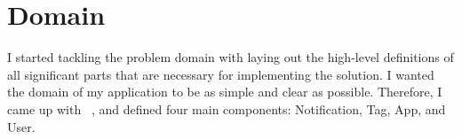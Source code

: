 \section{Domain}\label{sec:domain}

I started tackling the problem domain with laying out
the high-level definitions of all significant parts
that are necessary for implementing the solution.
I wanted the domain of my application
to be as simple and clear as possible.
Therefore,
I came up with
~\cite{evans_domain-driven_2003,millett_patterns_2015},
and defined four main components: Notification, Tag, App, and User.





